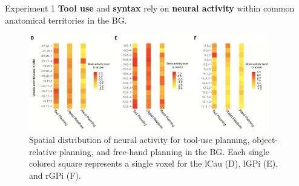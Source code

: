 \begin{frame}{Experiment 1}
\fontsize{11pt}{15}\selectfont
\textbf{Tool use} and \textbf{syntax} rely on \textbf{neural activity} within common anatomical territories in the BG.\\ %
\begin{figure}
    \centering
    \includegraphics[width=10.5cm]{images/paper_pics/fig2DEF.png}
    \caption*{Spatial distribution of neural activity for tool-use planning, object-relative planning, and free-hand planning in the BG. Each single colored square represents a single voxel for the lCau (D), lGPi (E), and rGPi (F).}
    \label{fig:label5}
\end{figure}

\end{frame}
